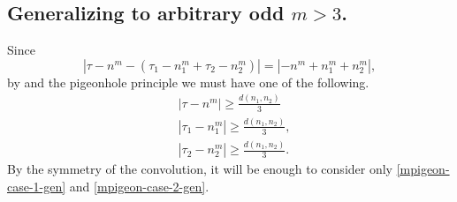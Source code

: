 \subsection{Generalizing to arbitrary odd \texorpdfstring{$m >3$}{m > 3}.}
%
%
Since $$| \tau - n^m - \left( \tau_1 - n_1^m 
+ \tau_2 - n_2^m  \right ) | = | - n^m + n_1^m +
n_2^m|,$$ by and
the pigeonhole principle we must have one of the 
following.
%
%
\begin{align}
	\label{mpigeon-case-1-gen}
	& |\tau - n^m| \ge \frac{d(n_1, n_2)}{3} 	\\
		\label{mpigeon-case-2-gen}
		& | \tau_1 - n_1^m | \ge \frac{d(n_1, n_2)}{3},		\\
		\label{mpigeon-case-3-gen}
		& | \tau_2 - n_2^m | \ge \frac{d(n_1, n_2)}{3}.
	\end{align}
%
%
By the symmetry of the convolution, it will be enough to consider only
\eqref{mpigeon-case-1-gen} and \eqref{mpigeon-case-2-gen}.
%
%
%
